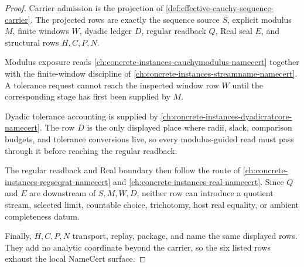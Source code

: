 \begin{proof}
Carrier admission is the projection of \autoref{def:effective-cauchy-sequence-carrier}. The projected rows are exactly the sequence source $S$, explicit modulus $M$, finite windows $W$, dyadic ledger $D$, regular readback $Q$, Real seal $E$, and structural rows $H,C,P,N$.

Modulus exposure reads \autoref{ch:concrete-instances-cauchymodulus-namecert} together with the finite-window discipline of \autoref{ch:concrete-instances-streamname-namecert}. A tolerance request cannot reach the inspected window row $W$ until the corresponding stage has first been supplied by $M$.

Dyadic tolerance accounting is supplied by \autoref{ch:concrete-instances-dyadicratcore-namecert}. The row $D$ is the only displayed place where radii, slack, comparison budgets, and tolerance conversions live, so every modulus-guided read must pass through it before reaching the regular readback.

The regular readback and Real boundary then follow the route of \autoref{ch:concrete-instances-regseqrat-namecert} and \autoref{ch:concrete-instances-real-namecert}. Since $Q$ and $E$ are downstream of $S,M,W,D$, neither row can introduce a quotient stream, selected limit, countable choice, trichotomy, host real equality, or ambient completeness datum.

Finally, $H,C,P,N$ transport, replay, package, and name the same displayed rows. They add no analytic coordinate beyond the carrier, so the six listed rows exhaust the local NameCert surface.
\end{proof}

